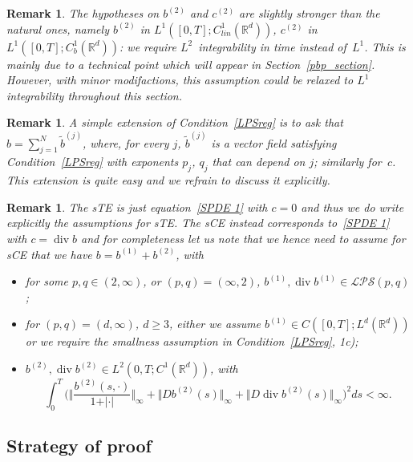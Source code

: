 \documentclass[a4paper,10pt]{article}
\newtheorem{remark}[theorem]{Remark}
\newcommand\1{\mathbbm{1}}
\DeclareMathOperator{\diverg}{div}
\numberwithin{equation}{section}
\begin{document}
\begin{remark}\label{L2time}
The hypotheses on $b^{(2)}$ and $c^{(2)}$ are slightly stronger than the natural ones, namely $b^{(2)}$ in $L^{1}([0,T];C^{1}_{lin}(\mathbb{R}^{d}))$, $c^{(2)}$ in $L^{1}([0,T];C^{1}_{b}(\mathbb{R}^{d}))$: we require $L^2$~integrability in time instead of~$L^1$. This is mainly due to a technical point which will appear in Section~\ref{pbp_section}. However, with minor modifactions, this assumption could be relaxed to $L^1$ integrability throughout this section.
\end{remark}

\begin{remark}
A simple extension of Condition~\ref{LPSreg} is to ask that $b=\sum_{j=1}^{N} \tilde{b}^{(j)}$, where, for every $j$, $\tilde{b}^{(j)}$ is a vector field satisfying Condition~\ref{LPSreg} with exponents $p_{j}$, $q_{j}$ that can depend on $j$; similarly for~$c$. This extension is quite easy and we refrain to discuss it explicitly.
\end{remark}

\begin{remark}
\label{Remark assumptions sCE}
The sTE is just equation~\eqref{SPDE 1} with $c=0$ and thus we do write explicitly the assumptions for sTE. The sCE instead corresponds to~\eqref{SPDE 1} with $c=\diverg b$ and for completeness let us note that we hence need to assume for sCE that we have $b=b^{(1)}+b^{(2)}$, with
\begin{itemize}[font=\normalfont]
  \item[(i$_{0}$)] for some $p,q\in(2,\infty)$, or $(p,q)
=(\infty,2)$, $b^{(1)},\diverg  
b^{(1)} \in \mathcal{LPS}(p,q)$;
  \item[(i$_{1}$)] for $(p,q)  =(d,\infty)$, $d\geq3$, either we assume $b^{(1)}\in C([0,T];L^{d}(\mathbb{R}^{d}))$ or we require the smallness assumption in Condition~\ref{LPSreg}, \textup{1c)};
  \item[(ii)] $b^{(2)},\diverg b^{(2)}\in L^{2}(0,T;C^{1}(\mathbb{R}^{d}))$, with
\[
\int_{0}^{T}\Big(\Big\Vert \frac{b^{(2)}(s,\cdot)}{1+\vert \cdot\vert} \Big\Vert_{\infty
}+\big\Vert Db^{(2)}(s)  \big\Vert_{\infty}+ \big\Vert D\diverg b^{(2)} (s)
\big\Vert_{\infty}\Big)^2  ds<\infty .
\]
\end{itemize}
\end{remark}


\subsection{Strategy of proof}
\label{subsection_strategy_regularity}
\end{document}
